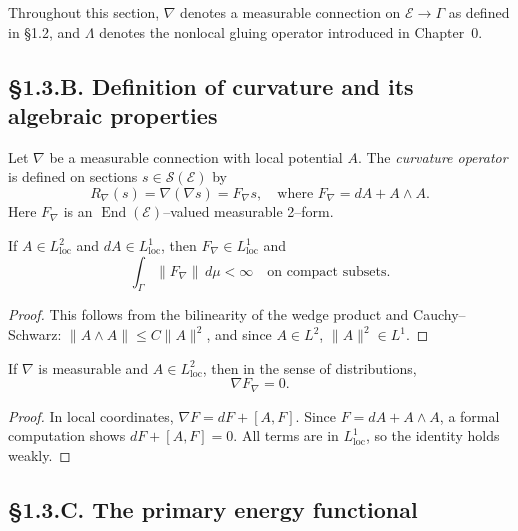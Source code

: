 Throughout this section, $\nabla$ denotes a measurable connection on $\mathcal{E}\to\Gamma$ as defined in §1.2, and $\Lambda$ denotes the nonlocal gluing operator introduced in Chapter~0.

\subsection*{§1.3.B. Definition of curvature and its algebraic properties}

\begin{definition}\label{def:1.3.curv}
Let $\nabla$ be a measurable connection with local potential $A$.  
The \emph{curvature operator} is defined on sections $s\in\mathcal{S}(\mathcal E)$ by
\[
R_\nabla(s) = \nabla(\nabla s) = F_\nabla s,
\quad\text{where } F_\nabla = dA + A\wedge A.
\]
Here $F_\nabla$ is an $\operatorname{End}(\mathcal E)$–valued measurable 2–form.
\end{definition}

\begin{lemma}\label{lem:1.3.meas}
If $A\in L^2_{\mathrm{loc}}$ and $dA\in L^1_{\mathrm{loc}}$, then $F_\nabla\in L^1_{\mathrm{loc}}$ and
\[
\int_\Gamma \|F_\nabla\|\,d\mu < \infty \quad\text{on compact subsets}.
\]
\end{lemma}

\begin{proof}
This follows from the bilinearity of the wedge product and Cauchy–Schwarz:
$\|A\wedge A\|\le C\|A\|^2$, and since $A\in L^2$, $\|A\|^2\in L^1$.
\end{proof}

\begin{lemma}\label{lem:1.3.bianchi}
If $\nabla$ is measurable and $A\in L^2_{\mathrm{loc}}$, then in the sense of distributions,
\[
\nabla F_\nabla = 0.
\]
\end{lemma}

\begin{proof}
In local coordinates, $\nabla F = dF + [A,F]$. 
Since $F=dA+A\wedge A$, a formal computation shows $dF+[A,F]=0$. 
All terms are in $L^1_{\mathrm{loc}}$, so the identity holds weakly.
\end{proof}

\subsection*{§1.3.C. The primary energy functional}

